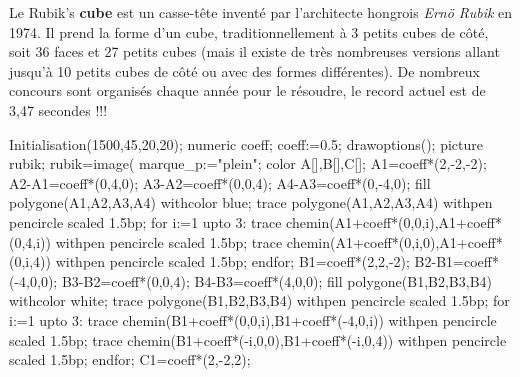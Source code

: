 \vspace*{-8mm}

\vspace*{-5mm}
\begin{debat}
    Le Rubik's {\bf cube} est un casse-tête inventé par l'architecte hongrois {\it Ernö Rubik} en 1974. Il prend la forme d'un cube, traditionnellement à 3 petits cubes de côté, soit 36 faces et 27 petits cubes (mais il existe de très nombreuses versions allant jusqu'à 10 petits cubes de côté ou avec des formes différentes). De nombreux concours sont organisés chaque année pour le résoudre, le record actuel est de 3,47 secondes !!!
    \begin{center} 
        \begin{Geometrie}[CoinBG={u*(-10,-10)},TypeTrace="Espace"]
            Initialisation(1500,45,20,20);
            numeric coeff;
            coeff:=0.5;             
            drawoptions();
            picture rubik;
            rubik=image(
            marque_p:="plein";
            color A[],B[],C[];            
            A1=coeff*(2,-2,-2);
            A2-A1=coeff*(0,4,0);
            A3-A2=coeff*(0,0,4);
            A4-A3=coeff*(0,-4,0);
            fill polygone(A1,A2,A3,A4) withcolor blue;
            trace polygone(A1,A2,A3,A4) withpen pencircle scaled 1.5bp;	
            for i:=1 upto 3:
                trace chemin(A1+coeff*(0,0,i),A1+coeff*(0,4,i)) withpen pencircle scaled 1.5bp;
                trace chemin(A1+coeff*(0,i,0),A1+coeff*(0,i,4)) withpen pencircle scaled 1.5bp;				
            endfor;	
            B1=coeff*(2,2,-2);
            B2-B1=coeff*(-4,0,0);
            B3-B2=coeff*(0,0,4);
            B4-B3=coeff*(4,0,0);
            fill polygone(B1,B2,B3,B4) withcolor white;
            trace polygone(B1,B2,B3,B4) withpen pencircle scaled 1.5bp;
            for i:=1 upto 3:
                trace chemin(B1+coeff*(0,0,i),B1+coeff*(-4,0,i)) withpen pencircle scaled 1.5bp;
                trace chemin(B1+coeff*(-i,0,0),B1+coeff*(-i,0,4)) withpen pencircle scaled 1.5bp;
            endfor;	
            C1=coeff*(2,-2,2);

\end{Geometrie}
\end{center}
\end{debat}
